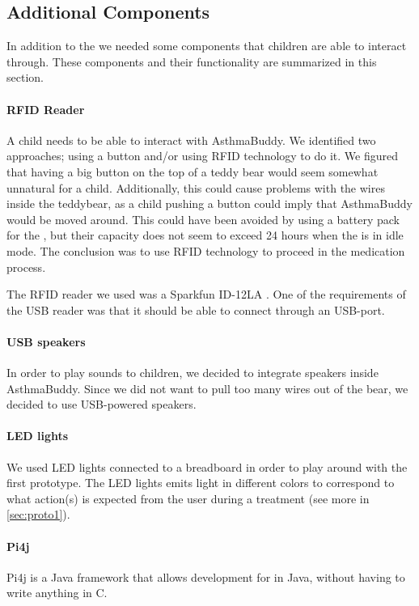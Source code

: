   
\subsection{Additional Components}
In addition to the \rpi{} we needed some components that children are able to interact through. These components and their functionality are summarized in this section. 


\paragraph{RFID Reader}
A child needs to be able to interact with AsthmaBuddy. We identified two approaches; using a button and/or using RFID technology to do it. We figured that having a big button on the top of a teddy bear would seem somewhat unnatural for a child. Additionally, this could cause problems with the wires inside the teddybear, as a child pushing a button could imply that AsthmaBuddy would be moved around. This could have been avoided by using a battery pack for the \rpi{}, but their capacity does not seem to exceed 24 hours when the \rpi{} is in idle mode. The conclusion was to use RFID technology to proceed in the medication process.


The RFID reader we used was a Sparkfun ID-12LA . One of the requirements of the USB reader was that it should be able to connect through an USB-port. 
         
\paragraph{USB speakers}
In order to play sounds to children, we decided to integrate speakers inside AsthmaBuddy. Since we did not want to pull too many wires out of the bear, we decided to use USB-powered speakers.    

\paragraph{LED lights}
We used LED lights connected to a breadboard in order to play around with the first prototype. The LED lights emits light in different colors to correspond to what action(s) is expected from the user during a treatment (see more in \ref{sec:proto1}).

\paragraph{Pi4j}
Pi4j is a Java framework that allows development for \rpi{} in Java, without having to write anything in C. 


